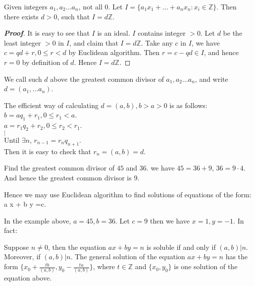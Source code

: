 \begin{corollary} 
Given integers $a_1,a_2 \ldots a_n$, not all $0$. Let $I =\{a_1 x_1 + \ldots +a_n x_n: x_i \in \mathbb{Z}\}$. Then there exists $d>0$, such that $I = d \mathbb{Z}$.
\end{corollary}

\begin{proof}[\bf Proof] 
It is easy to see that $I$ is an ideal. $I$ contains integer $>0$. Let $d$ be the least integer $>0$ in $I$, and claim that $I= d \mathbb{Z}$. Take any $c$ in $I$, we have $c= qd + r, 0 \le r < d$ by Euclidean algorithm. Then $r = c- qd \in I$, and hence $r=0$ by definition of $d$. Hence $I =d \mathbb{Z}$.
\end{proof}

\begin{definition} 
We call such $d$ above the greatest common divisor of $a_1,a_2 \ldots a_n$, and write $d=(a_1, \ldots a_n)$.
\end{definition}

\begin{flushleft}The efficient way of calculating $d=(a,b), b>a>0$ is as follows:\\
$b=aq_1 + r_1, 0 \le r_1 <a$.\\
$a=r_1 q_2 + r_2, 0 \le r_2 < r_1$.\\
$\vdots$\\
Until $\exists n$, $r_{n-1}=r_n q_{n+1}$.\\
Then it is easy to check that $r_n=(a,b)=d$.
\end{flushleft}

\begin{example} Find the greatest common divisor of $45$ and $36$. we have
$45 = 36 + 9$, $36 = 9 \cdot 4$. And hence the greatest common divisor is $9$.
\end{example}

Hence we may use Euclidean algorithm to find solutions of equations of the form:
\be
a \cdot x + b \cdot y =c.
\ee

In the example above, $a = 45, b = 36$. Let $c = 9$ then we have $x = 1, y = -1$. In fact:

\begin{theorem} Suppose $n \neq 0$, then the equation $ax+by=n$ is soluble if and only if $(a,b)|n$. Moreover, if $(a,b) | n$. The general solution of the equation $ax+by=n$ has the form $\{x_0+ \frac{tb}{(a,b)}, y_0 - \frac{ta}{(a,b)}\}$, where $t \in \mathbb{Z}$ and $\{x_0,y_0\}$ is one solution of the equation above.
\end{theorem}

